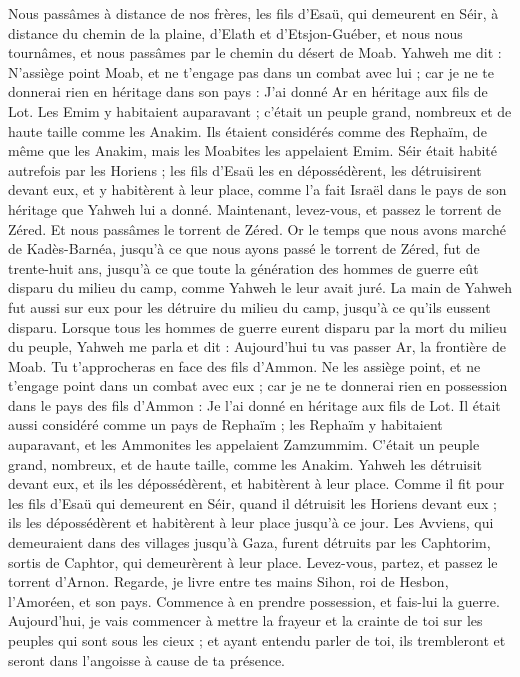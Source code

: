 \begin{multicols}{2}
Nous passâmes à distance de nos frères, les fils d'Esaü, qui demeurent en Séir, à distance du chemin de la plaine, d’Elath et d’Etsjon-Guéber, et nous nous tournâmes, et nous passâmes par le chemin du désert de Moab.
Yahweh me dit : N’assiège point Moab, et ne t’engage pas dans un combat avec lui ; car je ne te donnerai rien en héritage dans son pays : J'ai donné Ar en héritage aux fils de Lot.
Les Emim y habitaient auparavant ; c'était un peuple grand, nombreux et de haute taille comme les Anakim.
Ils étaient considérés comme des Rephaïm, de même que les Anakim, mais les Moabites les appelaient Emim.
Séir était habité autrefois par les Horiens ; les fils d'Esaü les en dépossédèrent, les détruisirent devant eux, et y habitèrent à leur place, comme l’a fait Israël dans le pays de son héritage que Yahweh lui a donné.
Maintenant, levez-vous, et passez le torrent de Zéred. Et nous passâmes le torrent de Zéred.
Or le temps que nous avons marché de Kadès-Barnéa, jusqu'à ce que nous ayons passé le torrent de Zéred, fut de trente-huit ans, jusqu'à ce que toute la génération des hommes de guerre eût disparu du milieu du camp, comme Yahweh le leur avait juré.
La main de Yahweh fut aussi sur eux pour les détruire du milieu du camp, jusqu'à ce qu'ils eussent disparu.
Lorsque tous les hommes de guerre eurent disparu par la mort du milieu du peuple,
Yahweh me parla et dit :
Aujourd'hui tu vas passer Ar, la frontière de Moab.
Tu t’approcheras en face des fils d’Ammon. Ne les assiège point, et ne t’engage point dans un combat avec eux ; car je ne te donnerai rien en possession dans le pays des fils d’Ammon : Je l'ai donné en héritage aux fils de Lot.
Il était aussi considéré comme un pays de Rephaïm ; les Rephaïm y habitaient auparavant, et les Ammonites les appelaient Zamzummim.
C’était un peuple grand, nombreux, et de haute taille, comme les Anakim. Yahweh les détruisit devant eux, et ils les dépossédèrent, et habitèrent à leur place.
Comme il fit pour les fils d'Esaü qui demeurent en Séir, quand il détruisit les Horiens devant eux ; ils les dépossédèrent et habitèrent à leur place jusqu'à ce jour.
Les Avviens, qui demeuraient dans des villages jusqu'à Gaza, furent détruits par les Caphtorim, sortis de Caphtor, qui demeurèrent à leur place.
Levez-vous, partez, et passez le torrent d'Arnon. Regarde, je livre entre tes mains Sihon, roi de Hesbon, l’Amoréen, et son pays. Commence à en prendre possession, et fais-lui la guerre.
Aujourd’hui, je vais commencer à mettre la frayeur et la crainte de toi sur les peuples qui sont sous les cieux ; et ayant entendu parler de toi, ils trembleront et seront dans l’angoisse à cause de ta présence.

\end{multicols}

